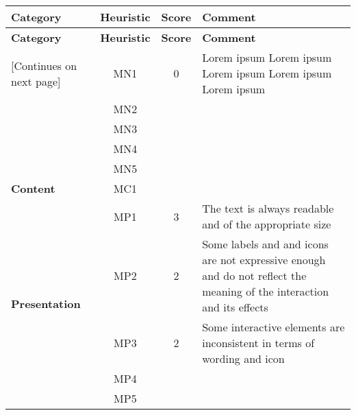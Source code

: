     \begin{tabularx}{\linewidth}{l c c X}
    \toprule
    \textbf{Category} & \textbf{Heuristic} & \textbf{Score} & \textbf{Comment} \\
    \midrule
    \endfirsthead
    \toprule
    \textbf{Category} & \textbf{Heuristic} & \textbf{Score} & \textbf{Comment} \\
    \midrule
    \endhead
    \midrule
    \footnotesize [Continues on next page]
    \endfoot
    \bottomrule
    \endlastfoot
    
    \multirow{5}{*}{\textbf{Navigation}}   & MN1 & 0 & Lorem ipsum Lorem ipsum Lorem ipsum Lorem ipsum Lorem ipsum \\ \cmidrule{2-4} 
                                            & MN2 &  &  \\ \cmidrule{2-4} 
                                            & MN3 &  &  \\ \cmidrule{2-4} 
                                            & MN4 &  &  \\ \cmidrule{2-4} 
                                            & MN5 &  &  \\ \midrule
    \textbf{Content}                       & MC1 &  &  \\ \midrule
    \multirow{5}{*}{\textbf{Presentation}} & MP1 & 3 & The text is always readable and of the appropriate size \\ \cmidrule{2-4} 
                                            & MP2 & 2 & Some labels and and icons are not expressive enough and do not reflect the meaning of the interaction and its effects\\ \cmidrule{2-4} 
                                            & MP3 & 2 & Some interactive elements are inconsistent in terms of wording and icon\\ \cmidrule{2-4} 
                                            & MP4 &  &  \\ \cmidrule{2-4} 
                                            & MP5 &  &
    \end{tabularx}
    
    \pagebreak